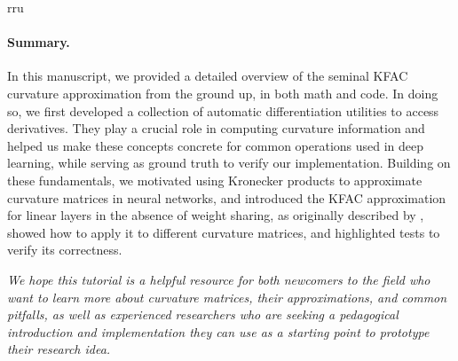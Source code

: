 rru\paragraph{Summary.} In this manuscript, we provided a detailed overview of the seminal KFAC curvature approximation from the ground up, in both math and code.
In doing so, we first developed a collection of automatic differentiation utilities to access derivatives.
They play a crucial role in computing curvature information and helped us make these concepts concrete for common operations used in deep learning, while serving as ground truth to verify our implementation.
Building on these fundamentals, we motivated using Kronecker products to approximate curvature matrices in neural networks, and introduced the KFAC approximation for linear layers in the absence of weight sharing, as originally described by \citet{martens2015optimizing}, showed how to apply it to different curvature matrices, and highlighted tests to verify its correctness.

\emph{We hope this tutorial is a helpful resource for both newcomers to the field who want to learn more about curvature matrices, their approximations, and common pitfalls, as well as experienced researchers who are seeking a pedagogical introduction and implementation they can use as a starting point to prototype their research idea.}

